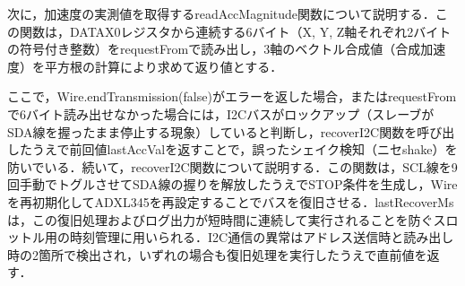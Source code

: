 次に，加速度の実測値を取得するreadAccMagnitude関数について説明する．この関数は，DATAX0レジスタから連続する6バイト（X, Y, Z軸それぞれ2バイトの符号付き整数）をrequestFromで読み出し，3軸のベクトル合成値（合成加速度）を平方根の計算により求めて返り値とする．

% 
% 
% 

ここで，Wire.endTransmission(false)がエラーを返した場合，またはrequestFromで6バイト読み出せなかった場合には，I2Cバスがロックアップ（スレーブがSDA線を握ったまま停止する現象）していると判断し，recoverI2C関数を呼び出したうえで前回値lastAccValを返すことで，誤ったシェイク検知（ニセshake）を防いでいる．続いて，recoverI2C関数について説明する．この関数は，SCL線を9回手動でトグルさせてSDA線の握りを解放したうえでSTOP条件を生成し，Wireを再初期化してADXL345を再設定することでバスを復旧させる．lastRecoverMsは，この復旧処理およびログ出力が短時間に連続して実行されることを防ぐスロットル用の時刻管理に用いられる．I2C通信の異常はアドレス送信時と読み出し時の2箇所で検出され，いずれの場合も復旧処理を実行したうえで直前値を返す．


\FloatBarrier


